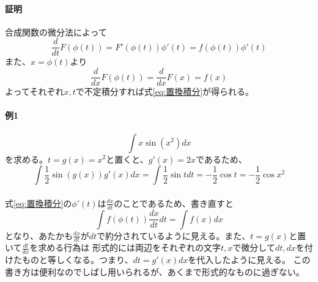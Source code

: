 \documentclass[a4j,dvipdfmx]{jsarticle}
\begin{document}
                \paragraph{証明} 合成関数の微分法によって
                \begin{equation}
                    \frac{d}{dt}F(\phi(t))=F'(\phi(t))\phi'(t)=f(\phi(t))\phi'(t) 
                \end{equation}
                また、$x=\phi(t)$より
                \begin{equation}
                    \frac{d}{dx}F(\phi(t))=\frac{d}{dx}F(x)=f(x)
                \end{equation}
                よってそれぞれ$x,t$で不定積分すれば式\eqref{eq:置換積分}が得られる。\\

                \paragraph{例1}
                \begin{equation*}
                    \int x\sin(x^2)dx
                \end{equation*}
                を求める。$t=g(x)=x^2$と置くと、$g'(x)=2x$であるため、
                \begin{equation*}
                    \int \frac{1}{2}\sin(g(x))g'(x)dx=\int \frac{1}{2}\sin t dt = -\frac{1}{2}\cos t = -\frac{1}{2}\cos x^2
                \end{equation*}\\

                式\eqref{eq:置換積分}の$\phi'(t)$は$\frac{dx}{dt}$のことであるため、書き直すと
                \begin{equation}
                    \int f(\phi(t))\frac{dx}{dt}dt =\int f(x)dx 
                \end{equation}
                となり、あたかも$\frac{dx}{dt}$が$dt$で約分されているように見える。また、$t=g(x)$と置いて$\frac{dt}{dx}$を求める行為は
                形式的には両辺をそれぞれの文字$t,x$で微分して$dt,dx$を付けたものと等しくなる。つまり、$dt=g'(x)dx$を代入したように見える。
                この書き方は便利なのでしばし用いられるが、あくまで形式的なものに過ぎない。
                \clearpage
\end{document}
